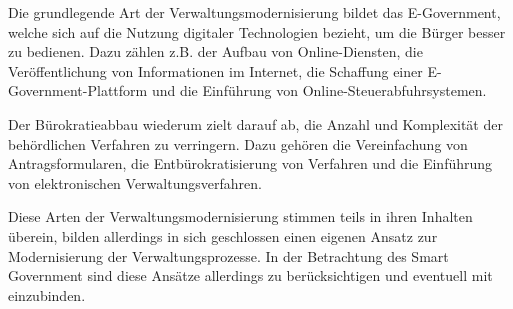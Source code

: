 Die grundlegende Art der Verwaltungsmodernisierung bildet das E-Government, welche sich auf die Nutzung digitaler Technologien bezieht, um die Bürger besser zu bedienen.
Dazu zählen z.B. der Aufbau von Online-Diensten, die Veröffentlichung von Informationen im Internet, die Schaffung einer E-Government-Plattform und die Einführung von Online-Steuerabfuhrsystemen.
\par
Der Bürokratieabbau wiederum zielt darauf ab, die Anzahl und Komplexität der behördlichen Verfahren zu verringern.
Dazu gehören die Vereinfachung von Antragsformularen, die Entbürokratisierung von Verfahren und die Einführung von elektronischen Verwaltungsverfahren.
\par
Diese Arten der Verwaltungsmodernisierung stimmen teils in ihren Inhalten überein, bilden allerdings in sich geschlossen einen eigenen Ansatz zur Modernisierung der Verwaltungsprozesse.
In der Betrachtung des Smart Government sind diese Ansätze allerdings zu berücksichtigen und eventuell mit einzubinden.

